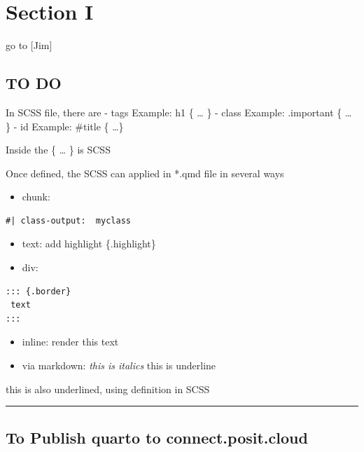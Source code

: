 \documentclass[
]{report}
\providecommand{\tightlist}{%
  \setlength{\itemsep}{0pt}\setlength{\parskip}{0pt}}
\begin{document}
\chapter{Section I}\label{section-i}

go to {[}Jim{]}

\section{TO DO}\label{to-do}

In SCSS file, there are - tags Example: h1 \{ \ldots{} \} - class
Example: .important \{ \ldots{} \} - id Example: \#title \{ \ldots\}

Inside the \{ \ldots{} \} is SCSS

Once defined, the SCSS can applied in *.qmd file in several ways

\begin{itemize}
\tightlist
\item
  chunk:
\end{itemize}

\begin{verbatim}
#| class-output:  myclass
\end{verbatim}

\begin{itemize}
\item
  text: add highlight \{.highlight\}
\item
  div:
\end{itemize}

\begin{verbatim}
::: {.border}
 text
:::
\end{verbatim}

\begin{itemize}
\item
  inline: {render this text}
\item
  via markdown: \emph{this is italics} this is underline
\end{itemize}

this is also underlined, using definition in SCSS

\begin{center}\rule{0.5\linewidth}{0.5pt}\end{center}

\section{To Publish quarto to
connect.posit.cloud}\label{to-publish-quarto-to-connect.posit.cloud}
\end{document}
